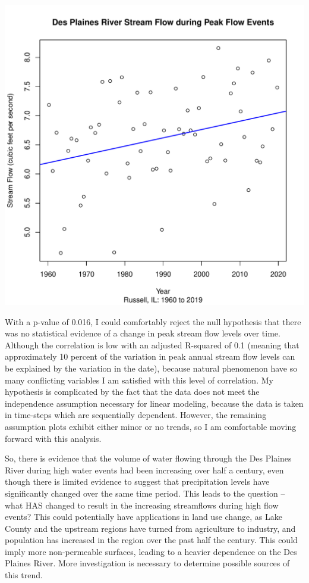 \documentclass{article}\usepackage[]{graphicx}\usepackage[]{color}
\makeatletter
\def\maxwidth{ %
  \ifdim\Gin@nat@width>\linewidth
    \linewidth
  \else
    \Gin@nat@width
  \fi
}
\newenvironment{knitrout}{}{} %
\makeatother
\begin{document}
\begin{knitrout}
\includegraphics[width=\maxwidth]{figure/unnamed-chunk-1-1} 

\end{knitrout}

With a p-value of 0.016, I could comfortably reject the null hypothesis that there was no statistical evidence of a change in peak stream flow levels over time.  Although the correlation is low with an adjusted R-squared of 0.1 (meaning that approximately 10 percent of the variation in peak annual stream flow levels can be explained by the variation in the date), because natural phenomenon have so many conflicting variables I am satisfied with this level of correlation.  My hypothesis is complicated by the fact that the data does not meet the independence assumption necessary for linear modeling, because the data is taken in time-steps which are sequentially dependent.  However, the remaining assumption plots exhibit either minor or no trends, so I am comfortable moving forward with this analysis.

So, there is evidence that the volume of water flowing through the Des Plaines River during high water events had been increasing over half a century, even though there is limited evidence to suggest that precipitation levels have significantly changed over the same time period.  This leads to the question -- what HAS changed to result in the increasing streamflows during high flow events?  This could potentially have applications in land use change, as Lake County and the upstream regions have turned from agriculture to industry, and population has increased in the region over the past half the century.  This could imply more non-permeable surfaces, leading to a heavier dependence on the Des Plaines River.  More investigation is necessary to determine possible sources of this trend.
\end{document}
